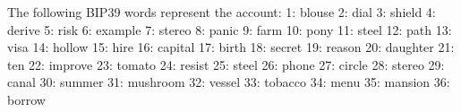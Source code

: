 \begin{shellbox}\begin{ttlst}
The following BIP39 words represent the account:
 1: blouse
 2: dial
 3: shield
 4: derive
 5: risk
 6: example
 7: stereo
 8: panic
 9: farm
10: pony
11: steel
12: path
13: visa
14: hollow
15: hire
16: capital
17: birth
18: secret
19: reason
20: daughter
21: ten
22: improve
23: tomato
24: resist
25: steel
26: phone
27: circle
28: stereo
29: canal
30: summer
31: mushroom
32: vessel
33: tobacco
34: menu
35: mansion
36: borrow
\end{ttlst}\end{shellbox}
